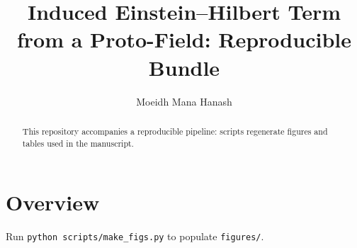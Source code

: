 \documentclass{iopart}
\begin{document}
\title{Induced Einstein--Hilbert Term from a Proto-Field: Reproducible Bundle}
\author{Moeidh Mana Hanash}
\address{Independent Researcher}
\begin{abstract}
This repository accompanies a reproducible pipeline: scripts regenerate figures and tables used in the manuscript.
\end{abstract}
\section{Overview}
Run \texttt{python scripts/make_figs.py} to populate \texttt{figures/}.
\end{document}

